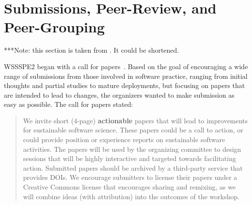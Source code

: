 \documentclass[11pt, oneside]{amsart}
\newcommand{\note}[1]{ {\textcolor{blueish}    { ***Note:      #1 }}}
\begin{document}
 

\section{Submissions, Peer-Review, and Peer-Grouping} \label{sec:preworkshop}

\note{this section is taken from \cite{WSSSPE2-pre-report}. It could be shortened.}

WSSSPE2 began with a call for papers~\cite{WSSSPE2-pre-report}. Based on the
goal of encouraging a wide range of submissions from those involved in software
practice, ranging from initial thoughts and partial studies to mature
deployments, but focusing on papers that are intended to lead to changes, the
organizers wanted to make submission as easy as possible. The call for papers
stated:

\begin{quote} We invite short (4-page) \textbf{actionable} papers that will lead
to improvements for sustainable software science. These papers could be a call
to action, or could provide position or experience reports on sustainable
software activities. The papers will be used by the organizing committee to
design sessions that will be highly interactive and targeted towards
facilitating action. Submitted papers should be archived by a third-party
service that provides DOIs. We encourage submitters to license their papers
under a Creative Commons license that encourages sharing and remixing, as we
will combine ideas (with attribution) into the outcomes of the workshop.
\end{quote}
\end{document}
